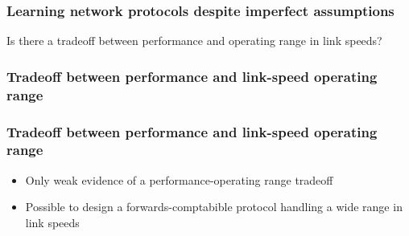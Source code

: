 \begin{frame}
\frametitle{Learning network protocols despite imperfect assumptions}
\begin{centering}
Is there a tradeoff between performance and operating range in link speeds?
\end{centering}
\end{frame}


\begin{frame}
\frametitle{Tradeoff between performance and link-speed operating range}
\begin{centering}

\noindent {}

\end{centering}
\end{frame}

\begin{frame}
\frametitle{Tradeoff between performance and link-speed operating range}
\begin{itemize}
\item <2->{Only weak evidence of a performance-operating range tradeoff}
\item <3->{Possible to design a forwards-comptabible protocol handling a wide range in link speeds}
\end{itemize}
\end{frame}
